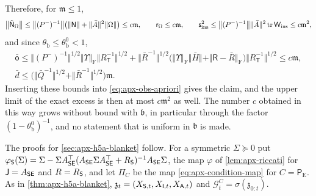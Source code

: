 \begin{remark}
\begin{equation*}
\end{equation*}
Therefore, for $\mathfrak m\le1$,
\begin{equation*}
\bigl\Vert\tilde{\mathsf N}_\Omega\bigr\Vert\le\bigl\Vert(P^-)^{-1}\bigr\Vert\bigl(\Vert\mathsf N\Vert+\Vert\bar A\Vert^2\Vert\Omega\Vert\bigr)\le c\mathfrak m,\qquad\mathsf r_\Omega\le c\mathfrak m,\qquad\mathsf s_{\mathrm{ins}}^2\le\bigl\Vert(P^-)^{-1}\bigr\Vert\Vert\bar A\Vert^2\operatorname{tr}\mathsf W_{\mathrm{ins}}\le c\mathfrak m^2 ,
\end{equation*}
and since $\theta_{\mathrm b}\le\theta^0_{\mathrm b}<1$,
\begin{equation*}
\begin{gathered}
\bar{\mathsf o}\le\bigl\Vert(P^-)^{-1}\bigr\Vert^{1/2}\Vert\Upsilon\Vert_{\mathrm F}\bigl\Vert R_{\mathsf T}^{-1}\bigr\Vert^{1/2}+\bigl\Vert\bar R^{-1}\bigr\Vert^{1/2}\bigl(\Vert\Upsilon\Vert_{\mathrm F}\Vert\bar H\Vert+\Vert\mathsf R-\bar R\Vert_{\mathrm F}\bigr)\bigl\Vert R_{\mathsf T}^{-1}\bigr\Vert^{1/2}\le c\mathfrak m,\\
\bar d\le\bigl(\Vert\bar Q^{-1}\Vert^{1/2}+\Vert\bar R^{-1}\Vert^{1/2}\bigr)\mathfrak m .
\end{gathered}
\end{equation*}
Inserting these bounds into \eqref{eq:apx-obs-apriori} gives the claim, and the upper limit of the exact excess is then at most $c\mathfrak m^2$ as well. The number $c$ obtained in this way grows without bound with $\mathfrak b$, in particular through the factor $(1-\theta^0_{\mathrm b})^{-1}$, and no statement that is uniform in $\mathfrak b$ is made.
\end{remark}

The proofs for \cref{sec:apx-h5a-blanket} follow. For a symmetric $\Sigma\succeq0$ put $\varphi_{\mathsf{S}}(\Sigma)=\Sigma-\Sigma A_{\mathsf{S}\mathsf{E}}^\top(A_{\mathsf{S}\mathsf{E}}\Sigma A_{\mathsf{S}\mathsf{E}}^\top+R_{\mathsf{S}})^{-1}A_{\mathsf{S}\mathsf{E}}\Sigma$, the map $\varphi$ of \cref{lem:apx-riccati} for $\mathsf J=A_{\mathsf{S}\mathsf{E}}$ and $R=R_{\mathsf{S}}$, and let $\Pi_C$ be the map \eqref{eq:apx-condition-map} for $C=\mathsf P_{\mathrm E}$. As in \cref{thm:apx-h5a-blanket}, $\mathfrak z_t=(X_{\mathsf{S},t},X_{\mathsf{I},t},X_{\mathsf{A},t})$ and $\mathcal G^C_t=\sigma(\mathfrak z_{0:t})$.

